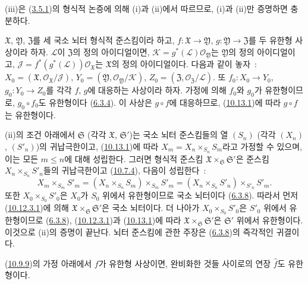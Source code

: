 (iii)은 (\hyperref[I.3.5.1-ko]{3.5.1})의 형식적 논증에 의해 (i)과
(ii)에서 따르므로, (i)과 (ii)만 증명하면 충분하다.

$\mathfrak{X}$, $\mathfrak{Y}$, $\mathfrak{Z}$를 세 국소 뇌터 형식적
준스킴이라 하고, $f:\mathfrak{X}\to\mathfrak{Y}$,
$g:\mathfrak{Y}\to\mathfrak{Z}$를 두 유한형 사상이라 하자.
$\mathscr{L}$이 $\mathfrak{Z}$의 정의 아이디얼이면,
$\mathscr{K}=g^*(\mathscr{L})\mathscr{O}_{\mathfrak{Y}}$는
$\mathfrak{Y}$의 정의 아이디얼이고,
$\mathscr{J}=f^*(g^*(\mathscr{L}))\mathscr{O}_{\mathfrak{X}}$는
$\mathfrak{X}$의 정의 아이디얼이다. 다음과 같이 놓자~:
$X_0=(\mathfrak{X},\mathscr{O}_{\mathfrak{X}}/\mathscr{J})$,
$Y_0=(\mathfrak{Y},\mathscr{O}_{\mathfrak{Y}}/\mathscr{K})$,
$Z_0=(\mathfrak{Z},\mathscr{O}_{\mathfrak{Z}}/\mathscr{L})$.
또 $f_0:X_0\to Y_0$, $g_0:Y_0\to Z_0$를 각각 $f$, $g$에 대응하는
사상이라 하자. 가정에 의해 $f_0$와 $g_0$가 유한형이므로,
$g_0\circ f_0$도 유한형이다 (\hyperref[I.6.3.4-ko]{6.3.4}). 이
사상은 $g\circ f$에 대응하므로, (\hyperref[I.10.13.1-ko]{10.13.1})에
따라 $g\circ f$는 유한형이다.

(ii)의 조건 아래에서 $\mathfrak{S}$ (각각 $\mathfrak{X}$,
$\mathfrak{S}'$)는 국소 뇌터 준스킴들의 열 $(S_n)$ (각각 $(X_n)$,
$(S'_n)$)의 귀납극한이고, (\hyperref[I.10.13.1-ko]{10.13.1})에 따라
$X_m=X_n\times_{S_n}S_m$라고 가정할 수 있으며, 이는 모든
$m\leq n$에 대해 성립한다. 그러면
형식적 준스킴
$\mathfrak{X}\times_{\mathfrak{S}}\mathfrak{S}'$은 준스킴
$X_n\times_{S_n}S'_n$들의 귀납극한이고
(\hyperref[I.10.7.4-ko]{10.7.4}), 다음이 성립한다~:
\[
  X_m\times_{S_m}S'_m
  =(X_n\times_{S_n}S_m)\times_{S_m}S'_m
  =(X_n\times_{S_n}S'_n)\times_{S'_n}S'_m.
\]
또한 $X_0\times_{S_0}S'_0$은 $X_0$가 $S_0$ 위에서 유한형이므로
국소 뇌터이다
(\hyperref[I.6.3.8-ko]{6.3.8}). 따라서 먼저
(\hyperref[I.10.12.3.1-ko]{10.12.3.1})에 의해
$\mathfrak{X}\times_{\mathfrak{S}}\mathfrak{S}'$은 국소 뇌터이다.
더 나아가 $X_0\times_{S_0}S'_0$은 $S'_0$ 위에서 유한형이므로
(\hyperref[I.6.3.8-ko]{6.3.8}),
(\hyperref[I.10.12.3.1-ko]{10.12.3.1})과
(\hyperref[I.10.13.1-ko]{10.13.1})에 따라
$\mathfrak{X}\times_{\mathfrak{S}}\mathfrak{S}'$은
$\mathfrak{S}'$ 위에서 유한형이다. 이것으로 (ii)의 증명이 끝난다.
뇌터 준스킴에 관한 주장은 (\hyperref[I.6.3.8-ko]{6.3.8})의 즉각적인
귀결이다.

\begin{corollary}[10.13.6]
\label{I.10.13.6-ko}
(\hyperref[I.10.9.9-ko]{10.9.9})의 가정 아래에서 $f$가 유한형
사상이면, 완비화한 것들 사이로의 연장 $\widehat f$도 유한형이다.
\end{corollary}

